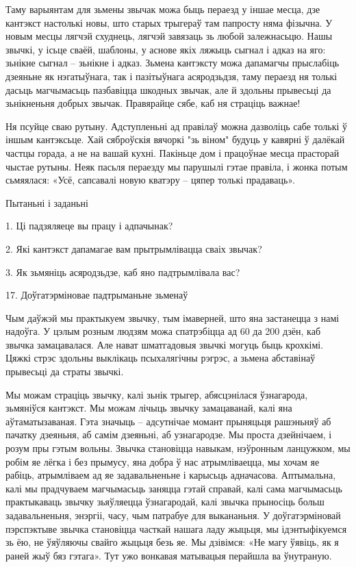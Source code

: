 Таму варыянтам для зьмены звычак можа быць пераезд у іншае месца, дзе кантэкст настолькі новы, што старых трыгераў там папросту няма фізычна. У новым месцы лягчэй схуднець, лягчэй завязаць зь любой залежнасьцю. Нашы звычкі, у ісьце сваёй, шаблоны, у аснове якіх ляжыць сыгнал і адказ на яго: зьнікне сыгнал – зьнікне і адказ. Зьмена кантэксту можа дапамагчы прыслабіць дзеяньне як нэгатыўнага, так і пазітыўнага асяродзьдзя, таму пераезд ня толькі дасьць магчымасьць пазбавіцца шкодных звычак, але й здольны прывесьці да зьнікненьня добрых звычак. Правярайце сябе, каб ня страціць важнае! 

Ня псуйце сваю рутыну. Адступленьні ад правілаў можна дазволіць сабе толькі ў іншым кантэксьце. Хай сяброўскія вячоркі "зь віном" будуць у кавярні ў далёкай частцы горада, а не на вашай кухні. Пакіньце дом і працоўнае месца прасторай чыстае рутыны. Неяк пасьля пераезду мы парушылі гэтае правіла, і жонка потым сьмяялася: «Усё, сапсавалі новую кватэру – цяпер толькі прадаваць».

Пытаньні і заданьні

1. Ці падзяляеце вы працу і адпачынак?

2. Які кантэкст дапамагае вам прытрымлівацца сваіх звычак?

3. Як зьмяніць асяродзьдзе, каб яно падтрымлівала вас?


17. Доўгатэрміновае падтрыманьне зьменаў

Чым даўжэй мы практыкуем звычку, тым імаверней, што яна застанецца з намі надоўга. У цэлым розным людзям можа спатрэбіцца ад 60 да 200 дзён, каб звычка замацавалася. Але нават шматгадовыя звычкі могуць быць крохкімі. Цяжкі стрэс здольны выклікаць псыхалягічны рэгрэс, а зьмена абставінаў прывесьці да страты звычкі. 

Мы можам страціць звычку, калі зьнік трыгер, абясцэнілася ўзнагарода, зьмяніўся кантэкст. Мы можам лічыць звычку замацаванай, калі яна аўтаматызаваная. Гэта значыць – адсутнічае момант прыняцьця рашэньняў аб пачатку дзеяньня, аб самім дзеяньні, аб узнагародзе. Мы проста дзейнічаем, і розум пры гэтым вольны. Звычка становіцца навыкам, нэўронным ланцужком, мы робім яе лёгка і без прымусу, яна добра ў нас атрымліваецца, мы хочам яе рабіць, атрымліваем ад яе задавальненьне і карысьць адначасова. Аптымальна, калі мы прадчуваем магчымасьць заняцца гэтай справай, калі сама магчымасьць практыкаваць звычку зьяўляецца ўзнагародай, калі звычка прыносіць больш задавальненьня, энэргіі, часу, чым патрабуе для выкананьня. У доўгатэрміновай пэрспэктыве звычка становіцца часткай нашага ладу жыцьця, мы ідэнтыфікуемся зь ёю, не ўяўляючы свайго жыцьця безь яе. Мы дзівімся: «Не магу ўявіць, як я раней жыў бяз гэтага». Тут ужо вонкавая матывацыя перайшла ва ўнутраную.

